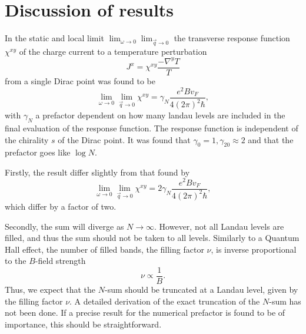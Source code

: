 %   


\section{Discussion of results}
In the static and local limit $\lim_{\omega \to 0} \lim_{\vec{q}\to 0}$ the  transverse response function $\chi^{xy}$ of the charge current to a temperature perturbation
\begin{equation}\label{eq:36}
  J^x = \chi ^{xy} \frac{- \nabla^y T}{T}
\end{equation}
from a single Dirac point was found  to be
\begin{equation}
  \lim_{\omega \to 0} \lim_{\vec{q}\to 0}
  \chi ^{xy}
  =
  \gamma_{N}
  \frac{e^2 B v_F}{4 (2\pi )^2 \hbar },
\end{equation}
with $\gamma _N$ a prefactor dependent on how many landau levels are included in the final evaluation of the response function.
The response function is independent of the chirality $s$ of the Dirac point.
It was found that $\gamma _0 = 1, \gamma _{20} \approx 2$ and that the prefactor goes like $\log N$.

Firstly, the result differ slightly from that found by~\citeauthor{arjonaFingerprintsConformalAnomaly2019} ~\cite{arjonaFingerprintsConformalAnomaly2019}
\begin{equation}
  \lim_{\omega \to 0} \lim_{\vec{q}\to 0}
  \chi ^{xy}
  =
  2 \gamma_{N}
  \frac{e^2 B v_F}{4 (2\pi )^2 \hbar },
\end{equation}
which differ by a factor of two.

Secondly, the sum will diverge as $N\to \infty $.
However, not all Landau levels are filled, and thus the sum should not be taken to all levels.
Similarly to a Quantum Hall effect, the number of filled bands, the filling factor $\nu $, is inverse proportional to the $B$-field strength
\begin{equation}
  \nu \propto \frac{1}{B}.
\end{equation}
Thus, we expect that the $N$-sum should be truncated at a Landau level, given by the filling factor $\nu $.
A detailed derivation of the exact truncation of the $N$-sum has not been done.
If a precise result for the numerical prefactor is found to be of importance, this should be straightforward.

